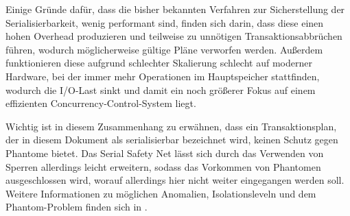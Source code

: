 Einige Gründe dafür, dass die bisher bekannten Verfahren zur Sicherstellung der Serialisierbarkeit, wenig performant sind, finden sich darin, dass diese einen hohen Overhead produzieren und teilweise zu unnötigen Transaktionsabbrüchen führen, wodurch möglicherweise gültige Pläne verworfen werden.
Außerdem funktionieren diese aufgrund schlechter Skalierung schlecht auf moderner Hardware, bei der immer mehr Operationen im Hauptspeicher stattfinden, wodurch die I/O-Last sinkt und damit ein noch größerer Fokus auf einem effizienten Concurrency-Control-System liegt.

Wichtig ist in diesem Zusammenhang zu erwähnen, dass ein Transaktionsplan, der in diesem Dokument als serialisierbar bezeichnet wird, keinen Schutz gegen Phantome bietet.
Das Serial Safety Net lässt sich durch das Verwenden von Sperren allerdings leicht erweitern, sodass das Vorkommen von Phantomen ausgeschlossen wird, worauf allerdings hier nicht weiter eingegangen werden soll.
Weitere Informationen zu möglichen Anomalien, Isolationsleveln und dem Phantom-Problem finden sich in \cite{Berenson:1995}.